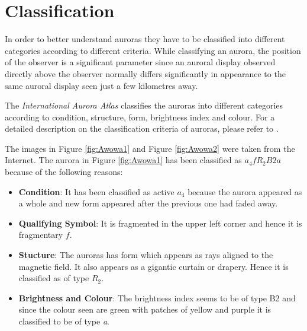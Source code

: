 \documentclass{article}
\begin{document}
 

\section{Classification}

In order to better understand auroras they have to be classified into different categories according to different criteria. While classifying an aurora, the position of the observer is a significant parameter since an auroral display observed directly above the observer normally differs significantly in appearance to the same auroral display seen just a few kilometres away.\cite{Stenberg:2012ab}

The \textit{International Aurora Atlas} classifies the auroras into different categories according to condition, structure, form, brightness index and colour. For a detailed description on the classification criteria of auroras, please refer to \cite{Stenberg:2012ab}.

The images in Figure \ref{fig:Awowa1} and Figure \ref{fig:Awowa2} were taken from the Internet. 
The aurora in Figure \ref{fig:Awowa1} has been classified as $a_4fR_2B2a$ because of the following reasons:

\begin{itemize}
\item \textbf{Condition}:  It has been classified as active $ a_4 $ because the aurora appeared as a whole and new form appeared after the previous one had faded away.
\item \textbf{Qualifying Symbol}: It is fragmented in the upper left corner and hence it is fragmentary $f$.
\item \textbf{Stucture}: The auroras has form which appears as rays aligned to the magnetic field. It also appears as a gigantic curtain or drapery. Hence it is classified as of type $R_2$.
\item \textbf{Brightness and Colour}: The brightness index seems to be of type B2 and since the colour seen are green with patches of yellow and purple it is classified to be of type \textit{a}.
\end{itemize}
\end{document}
